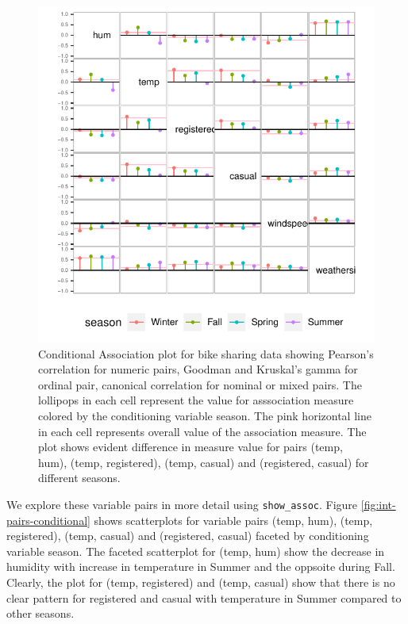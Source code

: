 \begin{figure}

{\centering \includegraphics{rjpaperCHMar22_files/figure-latex/cond-assoc-1} 

}

\caption{Conditional Association plot for bike sharing data showing Pearson's correlation for numeric pairs, Goodman and Kruskal's gamma for ordinal pair, canonical correlation for nominal or mixed pairs. The lollipops in each cell represent the value for asssociation measure colored by the conditioning variable season. The pink horizontal line in each cell represents overall value of the association measure. The plot shows evident difference in measure value for pairs (temp, hum), (temp, registered), (temp, casual) and (registered, casual) for different seasons.}\label{fig:cond-assoc}
\end{figure}

We explore these variable pairs in more detail using \texttt{show\_assoc}. Figure \ref{fig:int-pairs-conditional} shows scatterplots for variable pairs (temp, hum), (temp, registered), (temp, casual) and (registered, casual) faceted by conditioning variable season. The faceted scatterplot for (temp, hum) show the decrease in humidity with increase in temperature in Summer and the oppsoite during Fall. Clearly, the plot for (temp, registered) and (temp, casual) show that there is no clear pattern for registered and casual with temperature in Summer compared to other seasons.

